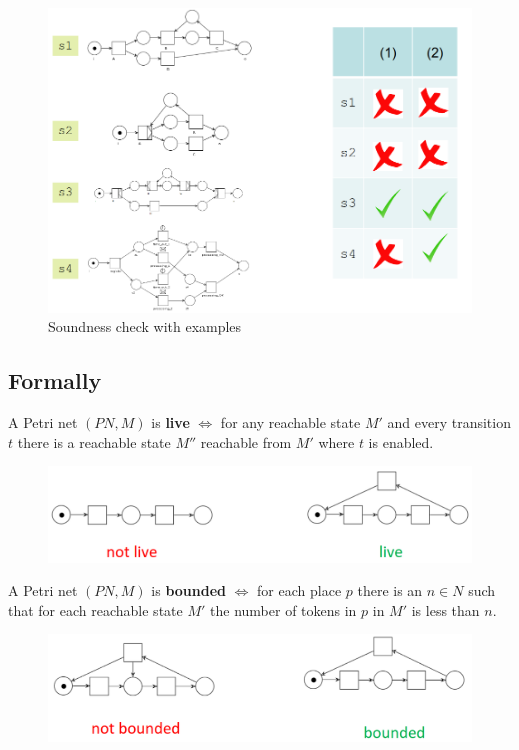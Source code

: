 \begin{figure}[htbp]
   \centering
   \includegraphics{images/wfnet_sound.png}
   \caption{Soundness check with examples}
   \label{fig:wfnet_sound}
\end{figure}

\subsection{Formally}
A Petri net $(PN,M)$ is \textbf{live} $\Longleftrightarrow$ for any reachable state $M'$ and every transition $t$ there is a reachable state $M''$ reachable from $M'$ where $t$ is enabled.

\begin{figure}[htbp]
   \centering
   \includegraphics{images/wfnet_liveness.png}
   \label{fig:wfnet_liveness}
\end{figure}

A Petri net $(PN,M)$ is \textbf{bounded} $\Longleftrightarrow$ for each place $p$ there is an $n \in N$ such that for each reachable state $M'$ the number of tokens in $p$ in $M'$ is less than $n$.

\begin{figure}[htbp]
   \centering
   \includegraphics{images/wfnet_bounded.png}
   \label{fig:wfnet_bounded}
\end{figure}

